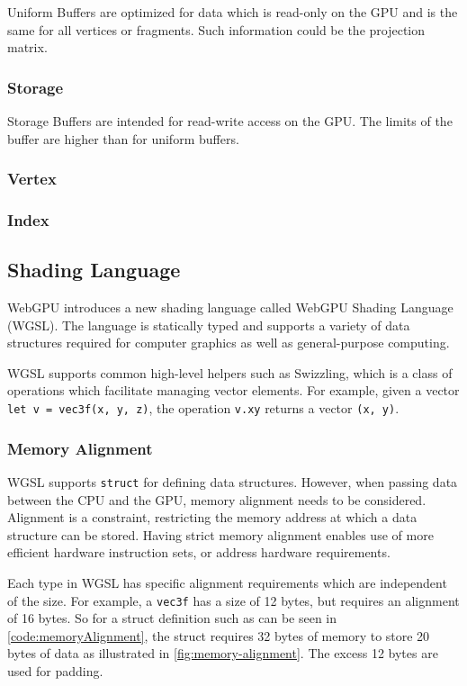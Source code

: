 Uniform Buffers are optimized for data which is read-only on the GPU and is the same for all vertices or fragments. Such information could be the projection matrix.

\subsubsection{Storage}

Storage Buffers are intended for read-write access on the GPU. The limits of the buffer are higher than for uniform buffers.

\subsubsection{Vertex}

\subsubsection{Index}

\subsection{Shading Language}

WebGPU introduces a new shading language called WebGPU Shading Language (WGSL). The language is statically typed and supports a variety of data structures required for computer graphics as well as general-purpose computing.

WGSL supports common high-level helpers such as Swizzling, which is a class of operations which facilitate managing vector elements. For example, given a vector \verb|let v = vec3f(x, y, z)|, the operation \verb|v.xy| returns a vector \verb|(x, y)|.

\subsubsection{Memory Alignment}

WGSL supports \verb|struct| for defining data structures. However, when passing data between the CPU and the GPU, memory alignment needs to be considered. Alignment is a constraint, restricting the memory address at which a data structure can be stored. Having strict memory alignment enables use of more efficient hardware instruction sets, or address hardware requirements.

Each type in WGSL has specific alignment requirements which are independent of the size. For example, a \verb|vec3f| has a size of 12 bytes, but requires an alignment of 16 bytes. So for a struct definition such as can be seen in \autoref{code:memoryAlignment}, the struct requires 32 bytes of memory to store 20 bytes of data as illustrated in \autoref{fig:memory-alignment}. The excess 12 bytes are used for padding.

